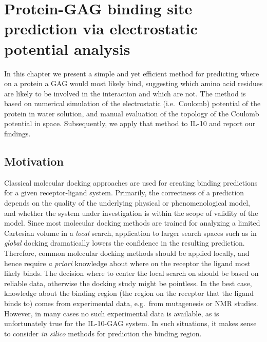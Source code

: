 \chapter{Protein-GAG binding site prediction via electrostatic potential analysis}

In this chapter we present a simple and yet efficient method for predicting
where on a protein a GAG would most likely bind, suggesting which amino acid
residues are likely to be involved in the interaction and which are not. The
method is based on numerical simulation of the electrostatic (i.e.\ Coulomb)
potential of the protein in water solution, and manual evaluation of the
topology of the Coulomb potential in space. Subsequently, we apply that method
to IL-10 and report our findings.

\section{Motivation}
\label{bspred:motivation}

Classical molecular docking approaches are used for creating binding predictions
for a given receptor-ligand system. Primarily, the correctness of a prediction
depends on the quality of the underlying physical or phenomenological model, and
whether the system under investigation is within the scope of validity of the
model. Since most molecular docking methods are trained for analyzing a limited
Cartesian volume in a \textit{local} search, application to larger search spaces
such as in \textit{global} docking dramatically lowers the confidence in the
resulting prediction. Therefore, common molecular docking methods should be
applied locally, and hence require \textit{a priori} knowledge about where on
the receptor the ligand most likely binds. The decision where to center the
local search on should be based on reliable data, otherwise the docking study
might be pointless. In the best case, knowledge about the binding region (the
region on the receptor that the ligand binds to) comes from experimental data,
e.g.\ from mutagenesis or NMR studies. However, in many cases no such
experimental data is available, as is unfortunately true for the IL-10-GAG
system. In such situations, it makes sense to consider \textit{in silico}
methods for prediction the binding region.

